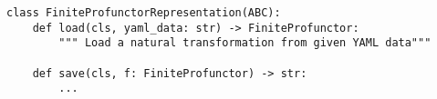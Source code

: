 \begin{verbatim}
class FiniteProfunctorRepresentation(ABC):
    def load(cls, yaml_data: str) -> FiniteProfunctor:
        """ Load a natural transformation from given YAML data"""

    def save(cls, f: FiniteProfunctor) -> str:
        ...
\end{verbatim}